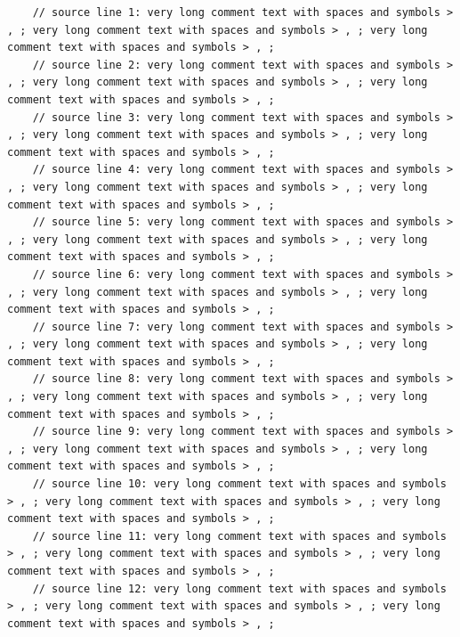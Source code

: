 \documentclass{article}
\begin{document}
\begin{Verbatim}
    // source line 1: very long comment text with spaces and symbols > , ; very long comment text with spaces and symbols > , ; very long comment text with spaces and symbols > , ; 
    // source line 2: very long comment text with spaces and symbols > , ; very long comment text with spaces and symbols > , ; very long comment text with spaces and symbols > , ; 
    // source line 3: very long comment text with spaces and symbols > , ; very long comment text with spaces and symbols > , ; very long comment text with spaces and symbols > , ; 
    // source line 4: very long comment text with spaces and symbols > , ; very long comment text with spaces and symbols > , ; very long comment text with spaces and symbols > , ; 
    // source line 5: very long comment text with spaces and symbols > , ; very long comment text with spaces and symbols > , ; very long comment text with spaces and symbols > , ; 
    // source line 6: very long comment text with spaces and symbols > , ; very long comment text with spaces and symbols > , ; very long comment text with spaces and symbols > , ; 
    // source line 7: very long comment text with spaces and symbols > , ; very long comment text with spaces and symbols > , ; very long comment text with spaces and symbols > , ; 
    // source line 8: very long comment text with spaces and symbols > , ; very long comment text with spaces and symbols > , ; very long comment text with spaces and symbols > , ; 
    // source line 9: very long comment text with spaces and symbols > , ; very long comment text with spaces and symbols > , ; very long comment text with spaces and symbols > , ; 
    // source line 10: very long comment text with spaces and symbols > , ; very long comment text with spaces and symbols > , ; very long comment text with spaces and symbols > , ; 
    // source line 11: very long comment text with spaces and symbols > , ; very long comment text with spaces and symbols > , ; very long comment text with spaces and symbols > , ; 
    // source line 12: very long comment text with spaces and symbols > , ; very long comment text with spaces and symbols > , ; very long comment text with spaces and symbols > , ; 
\end{Verbatim}
\end{document}
